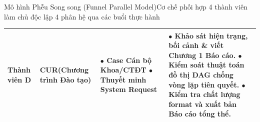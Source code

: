 \documentclass[aspectratio=169, 10pt]{beamer}
\begin{document}
\begin{frame}[t]{Mô hình Phễu Song song (Funnel Parallel Model)}{Cơ chế phối hợp 4 thành viên làm chủ độc lập 4 phân hệ qua các buổi thực hành}
\begin{tabularx}{\linewidth}{@{}P{2.0cm}P{2.4cm}YP{3.8cm}@{}}
    \midrule
    \textbf{Thành viên D} & 
    \textbf{CUR}\newline(Chương trình Đào tạo) & 
    $\bullet$ Case Cán bộ Khoa/CTĐT\newline
    $\bullet$ Thuyết minh System Request & 
    $\bullet$ Khảo sát hiện trạng, bối cảnh \& viết Chương 1 Báo cáo.\newline
    $\bullet$ Kiểm soát thuật toán đồ thị DAG chống vòng lặp tiên quyết.\newline
    $\bullet$ Kiểm tra chất lượng format và xuất bản Báo cáo tổng thể. \\
    \bottomrule
  \end{tabularx}
\end{frame}

\end{document}
